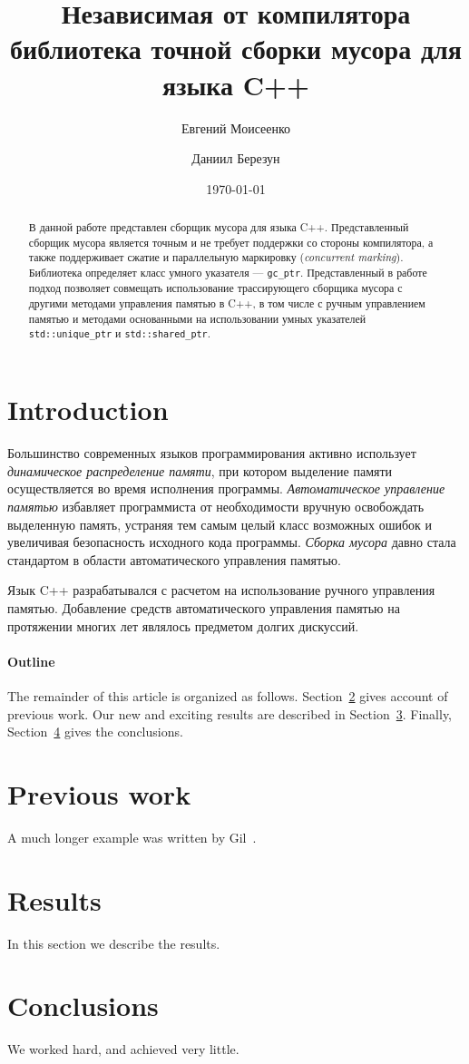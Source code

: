 \documentclass[10pt]{article}
\title{Независимая от компилятора библиотека точной сборки мусора для языка C++}
\author{
        Евгений Моисеенко \\
            \and
        Даниил Березун\\
}
\date{\today}
\newcommand{\code}{\texttt}
\begin{document}
\maketitle

\begin{abstract}
В данной работе представлен сборщик мусора для языка C++.
Представленный сборщик мусора является точным и не требует поддержки со стороны компилятора, 
а также поддерживает сжатие и параллельную маркировку (\textit{concurrent marking}).
Библиотека определяет класс умного указателя --- \code{gc\_ptr}.
Представленный в работе подход позволяет совмещать использование 
трассирующего сборщика мусора с другими методами управления памятью в C++, 
в том числе с ручным управлением памятью и методами основанными на использовании
умных указателей \code{std::unique\_ptr} и \code{std::shared\_ptr}. 

\end{abstract}

\section{Introduction}

Большинство современных языков программирования активно использует \emph{динамическое распределение памяти}, 
при котором выделение памяти осуществляется во время исполнения программы. 
\emph{Автоматическое управление памятью} избавляет программиста от необходимости вручную освобождать выделенную память, 
устраняя тем самым целый класс возможных ошибок и увеличивая безопасность исходного кода программы. 
\emph{Сборка мусора} давно стала стандартом в области автоматического управления памятью.


Язык C++ разрабатывался с расчетом на использование ручного управления памятью.
Добавление средств автоматического управления памятью на протяжении многих лет являлось предметом долгих дискуссий. 


\paragraph{Outline}
The remainder of this article is organized as follows.
Section~\ref{previous work} gives account of previous work.
Our new and exciting results are described in Section~\ref{results}.
Finally, Section~\ref{conclusions} gives the conclusions.

\section{Previous work}\label{previous work}
A much longer \LaTeXe{} example was written by Gil~\cite{Gil:02}.

\section{Results}\label{results}
In this section we describe the results.

\section{Conclusions}\label{conclusions}
We worked hard, and achieved very little.



\end{document}

